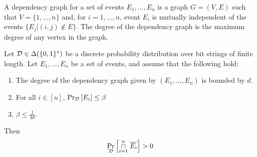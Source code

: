 \documentclass[11pt]{article}
\begin{document}
A dependency graph for a set of events $E_1, . . . , E_n$ is a graph $G=(V, E)$ such that $V = \{1,.. . , n\}$ and,  for $i= 1,\dots, n$, event $E_i$ is mutually independent
of the events $\{E_j | (i, j) \notin E\}$. The degree of the dependency graph is the maximum degree of any vertex in the graph.


\begin{lemma}\label{lemma:lll}Let $\mathcal{D} \in \Delta(\{0,1\}^*)$ be a discrete probability distribution over bit strings of finite length.
  Let $E_1,...,E_n$ be a set of events, and assume that the following hold:
\begin{enumerate}
\item The degree of the dependency graph given by $(E_1, \dots, E_n)$ is bounded by $d$.

\item For all $i \in [n]$, $\Pr_{\mathcal{D}}\left[E_i \right] \leq \beta$

\item $\beta \leq \frac{1}{4d}$.
\end{enumerate}
Then
\[ \Pr_{\mathcal{D}}\left[\overset{n}{ \underset{i=1}{\cap}} \hspace{0.1cm}  \overline{E_i} \right] > 0\]


\end{lemma}


\end{document}
